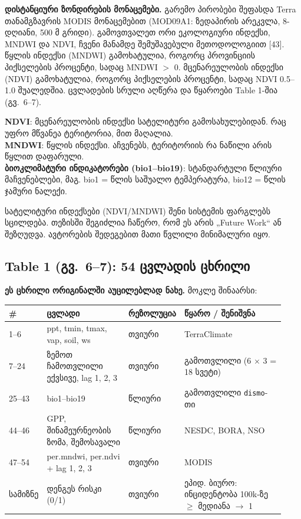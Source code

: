 \documentclass[11pt,a4paper]{article}
\newcommand{\imp}[1]{\textbf{\color{importred}#1}}
\begin{document}
\textbf{დისტანციური ზონდირების მონაცემები.} გარემო პირობები შეფასდა Terra თანამგზავრის MODIS მონაცემებით
(MOD09A1: ზედაპირის არეკვლა, 8-დღიანი, 500 მ გრიდი). გამოვთვალეთ ორი ეკოლოგიური ინდექსი, MNDWI და NDVI,
ჩვენი მანამდე შემუშავებული მეთოდოლოგიით [43]. წყლის ინდექსი (MNDWI) გამოხატულია, როგორც პროვინციის
პიქსელების პროცენტი, სადაც MNDWI $>$ 0. მცენარეულობის ინდექსი (NDVI) გამოხატულია, როგორც პიქსელების
პროცენტი, სადაც NDVI 0.5--1.0 შუალედშია. ცვლადების სრული აღწერა და წყაროები Table 1-შია (გვ.~6--7).

\begin{termin}
\textbf{NDVI}: მცენარეულობის ინდექსი სატელიტური გამოსახულებიდან. რაც უფრო მწვანეა ტერიტორია, მით მაღალია.\\
\textbf{MNDWI}: წყლის ინდექსი. აჩვენებს, ტერიტორიის რა ნაწილი არის წყლით დაფარული.\\
\textbf{ბიოკლიმატური ინდიკატორები (bio1--bio19)}: სტანდარტული წლიური მაჩვენებლები, მაგ. bio1 = წლის საშუალო ტემპერატურა, bio12 = წლის ჯამური ნალექი.
\end{termin}

\begin{skipbox}
სატელიტური ინდექსები (NDVI/MNDWI) შენი სისტემის ფარგლებს სცილდება. თეზისში შეგიძლია ჩაწერო, რომ
ეს არის „Future Work“ ან შეზღუდვა. ავტორების შედეგებით მათი წვლილი მინიმალური იყო.
\end{skipbox}

\subsection*{Table 1 (გვ.~6--7): 54 ცვლადის ცხრილი}

\imp{ეს ცხრილი ორიგინალში აუცილებლად ნახე.} მოკლე შინაარსი:

\begin{longtable}{@{}p{0.08\linewidth}p{0.30\linewidth}p{0.17\linewidth}p{0.38\linewidth}@{}}
\toprule
\textbf{\#} & \textbf{ცვლადი} & \textbf{რეზოლუცია} & \textbf{წყარო / შენიშვნა}\\
\midrule
1--6 & ppt, tmin, tmax, vap, soil, ws & თვიური & TerraClimate\\
7--24 & ზემოთ ჩამოთვლილი ექვსივე, lag 1, 2, 3 & თვიური & გამოთვლილი (6 $\times$ 3 = 18 სვეტი)\\
25--43 & bio1--bio19 & წლიური & გამოთვლილი \texttt{dismo}-თი\\
44--46 & GPP, შინამეურნეობის ზომა, შემოსავალი & წლიური & NESDC, BORA, NSO\\
47--54 & per.mndwi, per.ndvi + lag 1, 2, 3 & თვიური & MODIS\\
სამიზნე & დენგეს რისკი (0/1) & თვიური & ეპიდ. ბიურო: ინციდენტობა 100k-ზე $\geq$ მედიანა $
\rightarrow$ 1\\
\bottomrule
\end{longtable}
\end{document}
